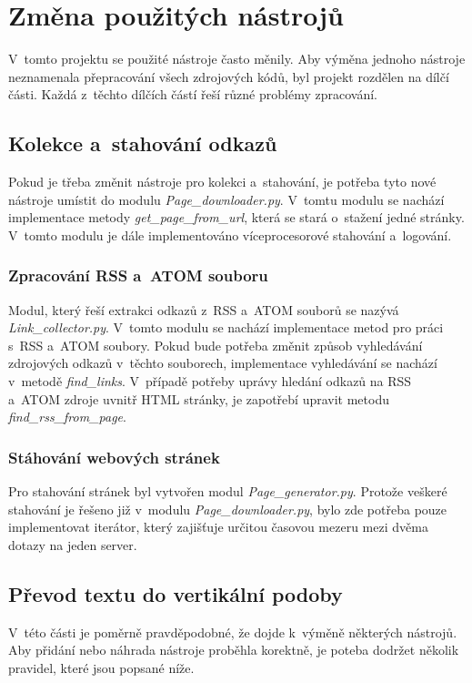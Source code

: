\section{Změna použitých nástrojů}
V~tomto projektu se použité nástroje často měnily. Aby výměna jednoho nástroje neznamenala
přepracování všech zdrojových kódů, byl projekt rozdělen na dílčí části. Každá z~těchto
dílčích částí řeší různé problémy zpracování.

\subsection{Kolekce a~stahování odkazů}
Pokud je třeba změnit nástroje pro kolekci a~stahování, je potřeba tyto nové nástroje
umístit do modulu \textit{Page\_downloader.py}. V~tomtu modulu se nachází implementace
metody \textit{get\_page\_from\_url}, která se stará o~stažení jedné stránky. V~tomto
modulu je dále implementováno víceprocesorové stahování a~logování.

\subsubsection{Zpracování RSS a~ATOM souboru}
Modul, který řeší extrakci odkazů z~RSS a~ATOM souborů se nazývá \textit{Link\_collector.py}.
V~tomto modulu se nachází implementace metod pro práci s~RSS a~ATOM soubory. Pokud bude
potřeba změnit způsob vyhledávání zdrojových odkazů v~těchto souborech, implementace vyhledávání
se nachází v~metodě \textit{find\_links}. V~případě potřeby uprávy hledání odkazů
na RSS a~ATOM zdroje uvnitř HTML stránky, je zapotřebí upravit metodu \textit{find\_rss\_from\_page}.

\subsubsection{Stáhování webových stránek}
Pro stahování stránek byl vytvořen modul \textit{Page\_generator.py}. Protože veškeré
stahování je řešeno již v~modulu \textit{Page\_downloader.py}, bylo zde potřeba pouze implementovat
iterátor, který zajišťuje určitou časovou mezeru mezi dvěma dotazy na jeden server.

\subsection{Převod textu do vertikální podoby}
V~této části je poměrně pravděpodobné, že dojde k~výměně některých nástrojů.
Aby přidání nebo náhrada nástroje proběhla korektně, je poteba dodržet několik
pravidel, které jsou popsané níže.

